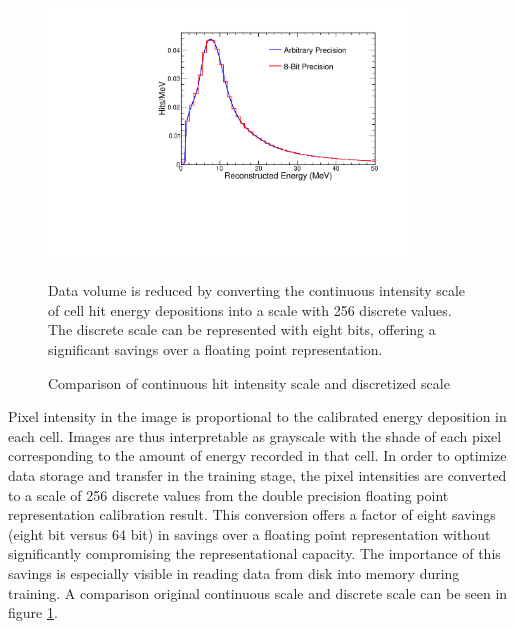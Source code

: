 \begin{figure}
\begin{center}
\includegraphics[width=0.85\textwidth]{figures/cnn/discrete_intensity.pdf}
\end{center}
\caption{Comparison of continuous hit intensity scale and discretized scale}{
Data volume is reduced by converting the continuous intensity scale of cell
hit energy depositions into a scale with 256 discrete values.
The discrete scale can be represented with eight bits, offering a significant
savings over a floating point representation.
}
\label{pixelmapadc}
\end{figure}


Pixel intensity in the image is proportional to the calibrated
energy deposition in each cell.
Images are thus interpretable as grayscale with the shade of
each pixel corresponding to the amount of energy recorded in that cell.
In order to optimize data storage and transfer in the training stage,
the pixel intensities are converted to a scale of 256 discrete values
from the double precision floating point representation calibration result.
This conversion offers a factor of eight savings (eight bit versus 64 bit) in
savings over a floating point representation
without significantly compromising the representational capacity.
The importance of this savings is especially visible in reading data from
disk into memory during training.
A comparison original continuous scale and discrete scale can be seen in figure
\ref{pixelmapadc}.

